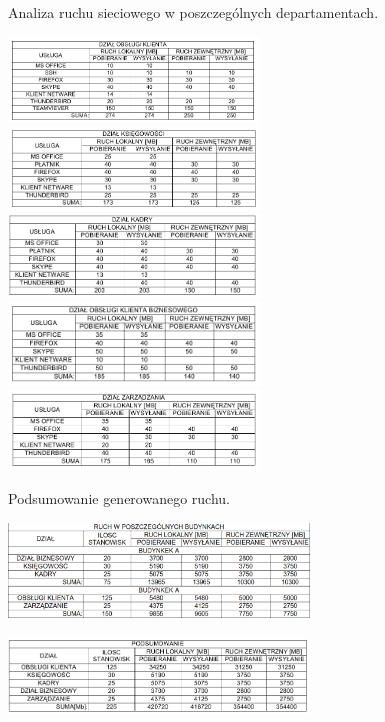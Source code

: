 \documentclass{report}
\begin{document}
\begin{table}[H]

\centering
\caption{Analiza ruchu sieciowego w poszczególnych departamentach. \label{tab:analiza dzialy}}

\includegraphics[width=0.5\textwidth]{./obrazki/ruch_tabele/d_ok.png}
\includegraphics[width=0.5\textwidth]{./obrazki/ruch_tabele/d_k.png}
\includegraphics[width=0.5\textwidth]{./obrazki/ruch_tabele/d_kad.png}
\includegraphics[width=0.5\textwidth]{./obrazki/ruch_tabele/d_b.png}
\includegraphics[width=0.5\textwidth]{./obrazki/ruch_tabele/d_m.png}   

\end{table}


\begin{table}[H]

\centering
\caption{Podsumowanie generowanego ruchu. \label{tab:analiza podsumowanie}}

\includegraphics[width=0.6\textwidth]{./obrazki/ruch_tabele/budynki.png}

\hspace{0,5cm}

      \includegraphics[width=0.6\textwidth]{./obrazki/ruch_tabele/podsumowanie.png}     
 
\end{table}
\end{document}
